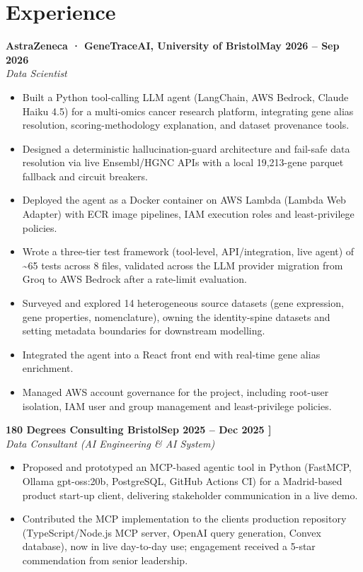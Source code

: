 \documentclass[a4paper,11pt]{article}
\newcommand{\entry}[4]{\needspace{4\baselineskip}\noindent\textbf{#1}\hfill\textbf{#2}\\ \textit{#3}\hfill\textit{#4}\par}
\begin{document}
\section{Experience}
\entry{AstraZeneca · GeneTraceAI, University of Bristol}{May 2026 – Sep 2026}{Data Scientist}{}
\begin{itemize}
  \item Built a Python tool-calling LLM agent (LangChain, AWS Bedrock, Claude Haiku 4.5) for a multi-omics cancer research platform, integrating gene alias resolution, scoring-methodology explanation, and dataset provenance tools.
  \item Designed a deterministic hallucination-guard architecture and fail-safe data resolution via live Ensembl/HGNC APIs with a local 19,213-gene parquet fallback and circuit breakers.
  \item Deployed the agent as a Docker container on AWS Lambda (Lambda Web Adapter) with ECR image pipelines, IAM execution roles and least-privilege policies.
  \item Wrote a three-tier test framework (tool-level, API/integration, live agent) of \textasciitilde{}65 tests across 8 files, validated across the LLM provider migration from Groq to AWS Bedrock after a rate-limit evaluation.
  \item Surveyed and explored 14 heterogeneous source datasets (gene expression, gene properties, nomenclature), owning the identity-spine datasets and setting metadata boundaries for downstream modelling.
  \item Integrated the agent into a React front end with real-time gene alias enrichment.
  \item Managed AWS account governance for the project, including root-user isolation, IAM user and group management and least-privilege policies.
\end{itemize}
\vspace{4pt}
\entry{180 Degrees Consulting Bristol}{Sep 2025 – Dec 2025   ]}{Data Consultant (AI Engineering \& AI System)}{}
\begin{itemize}
  \item Proposed and prototyped an MCP-based agentic tool in Python (FastMCP, Ollama gpt-oss:20b, PostgreSQL, GitHub Actions CI) for a Madrid-based product start-up client, delivering stakeholder communication in a live demo.
  \item Contributed the MCP implementation to the client\textquotesingle{}s production repository (TypeScript/Node.js MCP server, OpenAI query generation, Convex database), now in live day-to-day use; engagement received a 5-star commendation from senior leadership.
\end{itemize}
\end{document}
